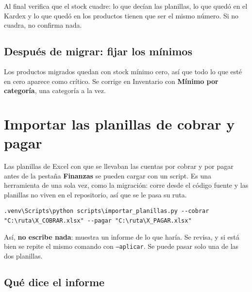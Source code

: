 \documentclass[11pt,a4paper]{article}
\begin{document}
Al final verifica que el stock cuadre: lo que decían las planillas, lo que quedó
en el Kardex y lo que quedó en los productos tienen que ser el mismo número. Si
no cuadra, no confirma nada.

\subsection{Después de migrar: fijar los mínimos}

Los productos migrados quedan con stock mínimo cero, así que todo lo que esté en
cero aparece como crítico. Se corrige en Inventario con \textbf{Mínimo por
categoría}, una categoría a la vez.

\section{Importar las planillas de cobrar y pagar}
\label{sec:importar}

Las planillas de Excel con que se llevaban las cuentas por cobrar y por pagar
antes de la pestaña \textbf{Finanzas} se pueden cargar con un script. Es una
herramienta de una sola vez, como la migración: corre desde el código fuente y las
planillas no viven en el repositorio, así que se le pasa su ruta.

\begin{lstlisting}
.venv\Scripts\python scripts\importar_planillas.py --cobrar "C:\ruta\X_COBRAR.xlsx" --pagar "C:\ruta\X_PAGAR.xlsx"
\end{lstlisting}

Así, \textbf{no escribe nada}: muestra un informe de lo que haría. Se revisa, y
si está bien se repite el mismo comando con \texttt{--aplicar}. Se puede pasar
solo una de las dos planillas.

\subsection{Qué dice el informe}
\end{document}
